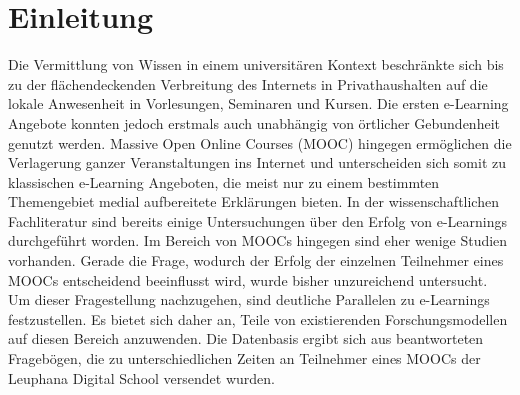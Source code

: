\section{Einleitung}
\label{sec:einleitung}

Die Vermittlung von Wissen in einem universitären Kontext beschränkte sich bis zu der flächendeckenden Verbreitung des Internets in Privathaushalten auf die lokale Anwesenheit in Vorlesungen, Seminaren und Kursen. Die ersten e-Learning Angebote konnten jedoch erstmals auch unabhängig von örtlicher Gebundenheit genutzt werden. Massive Open Online Courses (MOOC) hingegen ermöglichen die Verlagerung ganzer Veranstaltungen ins Internet und unterscheiden sich somit zu klassischen e-Learning Angeboten, die meist nur zu einem bestimmten Themengebiet medial aufbereitete Erklärungen bieten.
\newline
In der wissenschaftlichen Fachliteratur sind bereits einige Untersuchungen über den Erfolg von e-Learnings durchgeführt worden. Im Bereich von MOOCs hingegen sind eher wenige Studien vorhanden. Gerade die Frage, wodurch der Erfolg der einzelnen Teilnehmer eines MOOCs entscheidend beeinflusst wird, wurde bisher unzureichend untersucht. Um dieser Fragestellung nachzugehen, sind deutliche Parallelen zu e-Learnings festzustellen. Es bietet sich daher an, Teile von existierenden Forschungsmodellen auf diesen Bereich anzuwenden. Die Datenbasis ergibt sich aus beantworteten Fragebögen, die zu unterschiedlichen Zeiten an Teilnehmer eines MOOCs der Leuphana Digital School versendet wurden. 